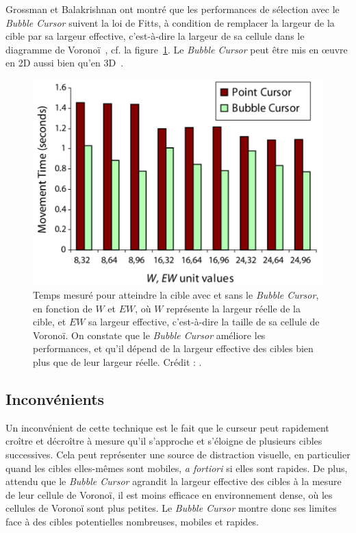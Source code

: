 	Grossman et Balakrishnan ont montré que les performances de sélection avec le \emph{Bubble Cursor} suivent la loi de Fitts, à condition de remplacer la largeur de la cible par sa largeur effective, c'est-à-dire la largeur de sa cellule dans le diagramme de Voronoï~\cite{grossman2005bubble}, cf. la figure~\ref{fig:bubbleResults}. Le \emph{Bubble Cursor} peut être mis en œuvre en 2D aussi bien qu'en 3D~\cite{vanacken2007exploring}.

	\begin{figure}[H]
		\centering
		\includegraphics[width=\textwidth]{figures/ch2/bubbleResults}
		\caption{Temps mesuré pour atteindre la cible avec et sans le \emph{Bubble Cursor}, en fonction de $W$ et $EW$, où $W$ représente la largeur réelle de la cible, et $EW$ sa largeur effective, c'est-à-dire la taille de sa cellule de Voronoï. On constate que le \emph{Bubble Cursor} améliore les performances, et qu'il dépend de la largeur effective des cibles bien plus que de leur largeur réelle. Crédit : \cite{grossman2005bubble}.}
		\label{fig:bubbleResults}
	\end{figure}

	\subsection{Inconvénients}
	Un inconvénient de cette technique est le fait que le curseur peut rapidement croître et décroître à mesure qu'il s'approche et s'éloigne de plusieurs cibles successives. Cela peut représenter une source de distraction visuelle, en particulier quand les cibles elles-mêmes sont mobiles, \emph{a fortiori} si elles sont rapides. De plus, attendu que le \emph{Bubble Cursor} agrandit la largeur effective des cibles à la mesure de leur cellule de Voronoï, il est moins efficace en environnement dense, où les cellules de Voronoï sont plus petites. Le \emph{Bubble Cursor} montre donc ses limites face à des cibles potentielles nombreuses, mobiles et rapides.
	
